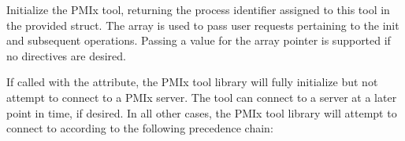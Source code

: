 \optattrend

\descr

Initialize the \ac{PMIx} tool, returning the process identifier assigned to this tool in the provided  struct. The  array is used to pass user requests pertaining to the init and subsequent operations. Passing a  value for the array pointer is supported if no directives are desired.

If called with the  attribute, the \ac{PMIx} tool library will fully initialize but not attempt to connect to a \ac{PMIx} server. The tool can connect to a server at a later point in time, if desired. In all other cases, the \ac{PMIx} tool library will attempt to connect to according to the following precedence chain:

